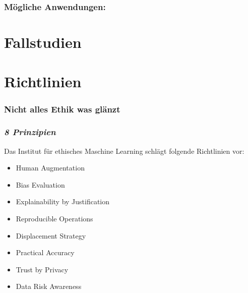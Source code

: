 \documentclass[aspectratio=169,xcolor=dvipsnames]{beamer}
\begin{document}

\begin{frame}
\frametitle{Mögliche Anwendungen:}
\end{frame}

\section{Fallstudien}

\begin{frame}
\frametitle{}
\end{frame}

\begin{frame}
\frametitle{}
\end{frame}

\begin{frame}
\frametitle{}
\end{frame}

\begin{frame}
\frametitle{}
\end{frame}

\section{Richtlinien}

\begin{frame}
\frametitle{Nicht alles Ethik was glänzt}
\end{frame}

\begin{frame}[fragile]
\frametitle{\emph{8 Prinzipien}}
\begin{center}
Das Institut für ethisches Maschine Learning schlägt folgende Richtlinien vor:
\end{center}
\medskip

\large
\setlength{\leftmargini}{150pt}
\begin{itemize}[label=\textcolor{RedOrange}{\textbullet}]
\item Human Augmentation
\item Bias Evaluation
\item Explainability by Justification 
\item Reproducible Operations
\item Displacement Strategy
\item Practical Accuracy
\item Trust by Privacy
\item Data Risk Awareness
\end{itemize}
\end{frame}
\end{document}
